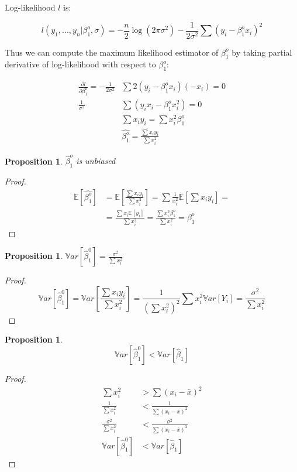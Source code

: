 \documentclass[12pt,a4paper,oneside]{book} %
\newtheorem{proposition}[theorem]{Proposition}
\begin{document}
	Log-likelihood $l$ is:

\[
	l(y_1,...,y_n | \beta_1^o, \sigma)=-\frac{n}{2}\log(2\pi \sigma^2)-\frac{1}{2 \sigma^2} \sum (y_i - \beta_1^o x_i)^2
\]

Thus we can compute the maximum likelihood estimator of $\beta_1^o$ by taking partial derivative of log-likelihood with respect to $\beta_1^o$:

\begin{align*}
	\frac{\partial l}{\partial \beta_1^o} = - \frac{1}{2 \sigma^2} & \sum 2(y_i-\beta_1^o x_i)(-x_i)=0 \\
	\frac{1}{\sigma^2}& \sum (y_i x_i - \beta_1^o x_i ^2) = 0 \\
	& \sum x_i y_i =  \sum  x_i^2 \beta_1^o \\
	& \hat{\beta_1^o} = \frac{\sum x_i y_i}{\sum x_i^2}
\end{align*}





	\begin{proposition}
		$\hat{\beta}_1^o$ is unbiased
	\end{proposition}

	\begin{proof}
		\begin{align*}
			\mathbb{E} [\hat{\beta_1^o}] &= \mathbb{E} [\frac{\sum x_i y_i}{\sum x_i^2}] = \sum \frac{1}{x_i^2} \mathbb{E}[\sum x_i y_i] = \\
			&= \frac{\sum x_i\mathbb{E}[y_i]}{\sum x_i^2} = \frac{\sum x_i^2 \beta_1^o}{\sum x_i^2} = \beta_1^o 
		\end{align*}
	\end{proof}


	\begin{proposition} \label{prop:variance_slop_no_intercept}
		$\mathbb{V}ar[\hat{\beta}_1^0] = \frac{\sigma^2}{\sum x_i^2}$
	\end{proposition}


	\begin{proof}
		\[
		\mathbb{V}ar[\hat{\beta}_1^0] =  \mathbb{V}ar[\frac{\sum x_i y_i}{\sum x_i^2}] = \frac{1}{(\sum x_i^2)^2} \sum x_i^2 \mathbb{V}ar[Y_i] = \frac{\sigma^2}{\sum x_i^2}
		\]
	\end{proof}


	\begin{proposition}
		\[
			\mathbb{V}ar[\hat{\beta}_1^0] < \mathbb{V}ar[\hat{\beta}_1]
		\]
	\end{proposition}

	\begin{proof}
		\begin{align*}
			\sum x_i^2 &> \sum (x_i - \bar{x})^2  \\
			\frac{1}{\sum x_i^2}  &< \frac{1}{\sum (x_i - \bar{x})^2}  \\
			\frac{\sigma^2}{\sum x_i^2}  &< \frac{\sigma^2}{\sum (x_i - \bar{x})^2}  \\
			\mathbb{V}ar[\hat{\beta}_1^0] &< \mathbb{V}ar[\hat{\beta}_1] 
		\end{align*}
	\end{proof}
\end{document}
